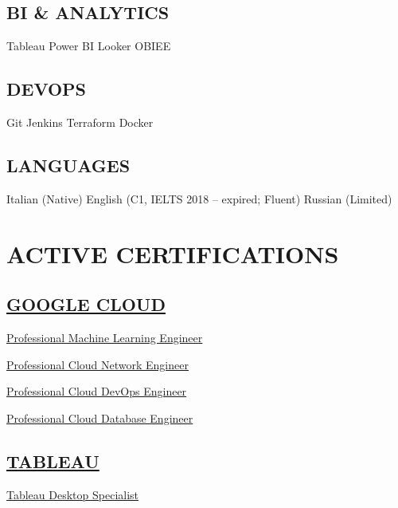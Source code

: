 \documentclass[]{deedy-resume-reversed}
\begin{document}
\begin{minipage}[t]{0.35\textwidth}
\sectionsep

\subsection{BI \& ANALYTICS}
Tableau \textbullet{} Power BI \textbullet{} Looker \textbullet{} OBIEE

\sectionsep

\subsection{DEVOPS}
Git \textbullet{} Jenkins \textbullet{} Terraform \textbullet{} Docker

\sectionsep

\subsection{LANGUAGES}
Italian (Native) \textbullet{} English (C1, IELTS 2018 – expired; Fluent) \textbullet{} Russian (Limited)

\section{ACTIVE CERTIFICATIONS}

\subsection{\href{https://cloud.google.com/}{GOOGLE CLOUD}}
\href{https://www.credly.com/badges/b55bbd99-441d-410e-ac38-ca5e7834b8ef/public_url}{Professional Machine Learning Engineer}

\href{https://www.credly.com/badges/03d9c9f3-04df-4e9b-ba2f-49a3169535cd/public_url}{Professional Cloud Network Engineer}

\href{https://www.credly.com/badges/c6d15809-9a56-48a9-b1e7-3864cbd76ed2/public_url}{Professional Cloud DevOps Engineer}

\href{https://www.credly.com/badges/8f5c5580-3ce9-47b7-9a74-e4bfb8c2cdb8/public_url}{Professional Cloud Database Engineer}

\sectionsep

\subsection{\href{https://www.tableau.com/}{TABLEAU}}
\href{https://www.credly.com/badges/d8a0b29c-ecb0-4f59-b6df-7b3a871f766e}{Tableau Desktop Specialist}


\end{minipage}
\end{document}
